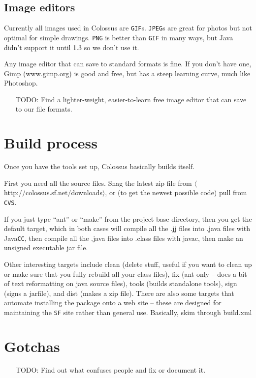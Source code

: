 \documentclass{article}
\begin{document}
\subsection{Image editors}

Currently all images used in Colossus are \texttt{GIF}s.  \texttt{JPEG}s are great for
photos but not optimal for simple drawings.  \texttt{PNG} is better than \texttt{GIF} 
in many ways, but Java didn't support it until 1.3 so we don't use it.

Any image editor that can save to standard formats is fine.  If you
don't have one, Gimp (www.gimp.org) is good and free, but has a steep
learning curve, much like Photoshop.  
\begin{itemize}
\item[TODO:]  Find a lighter-weight, easier-to-learn free image editor that 
can save to our file formats.
\end{itemize}

\section{Build process}

Once you have the tools set up, Colossus basically builds itself.

First you need all the source files.  Snag the latest zip file from 
$\langle$http://colossus.sf.net/downloads$\rangle$, or (to get
the newest possible code) pull from \texttt{CVS}.

If you just type ``ant'' or ``make'' from the project base directory,
then you get the default target, which in both cases will compile
all the .jj files into .java files with Java\texttt{CC}, then compile all
the .java files into .class files with javac, then make an unsigned
executable jar file.

Other interesting targets include clean (delete stuff, useful if
you want to clean up or make sure that you fully rebuild all your
class files), fix (ant only -- does a bit of text reformatting on
java source files), tools (builds standalone tools), sign (signs
a jarfile), and dist (makes a zip file).  There are also some
targets that automate installing the package onto a web site --
these are designed for maintaining the \texttt{SF} site rather than general
use.  Basically, skim through build.xml

\section{Gotchas}

\begin{itemize}
\item[TODO:] Find out what confuses people and fix or document it.
\end{itemize}



\end{document}
